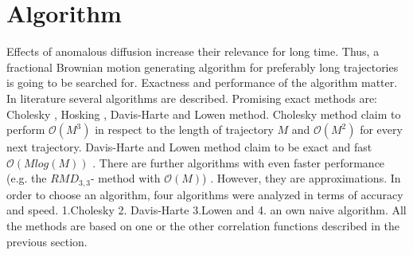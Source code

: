 \documentclass[
  a4paper,BCOR10mm,oneside,
  headsepline,footsepline,%
  fleqn,openbib
]{scrbook}
\begin{document}
\section{Algorithm}
Effects of anomalous diffusion increase their relevance for long time. Thus, a fractional Brownian motion generating algorithm for preferably long trajectories is going to be searched for. Exactness and performance of the algorithm matter. In literature several algorithms are described. Promising exact methods are: Cholesky \cite{Dieker2004}, Hosking \cite{WRCR:WRCR3676}, Davis-Harte \cite{Dieker2004} and  Lowen \cite{Lowen1999} method. Cholesky  method claim to perform $\mathcal{O}(M^3)$ in respect to the length of trajectory $M$ and $\mathcal{O}(M^2)$ for every next trajectory. Davis-Harte and Lowen method claim to be exact and fast $\mathcal{O}(M log(M))$ \cite{DAVIES1987}\cite{Lowen1999}. There are further algorithms with even faster performance (e.g. the $RMD_{3,3}$- method \cite{Dieker2004} with $\mathcal{O}(M)$) . However, they are approximations. In order to choose an algorithm, four algorithms were analyzed in terms of accuracy and speed. 1.Cholesky  2. Davis-Harte 3.Lowen and 4. an own naive algorithm. All the methods are based on one or the other correlation functions described in the previous section.  
\end{document}
